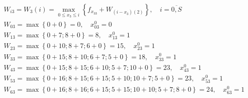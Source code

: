 \begin{align*}
     & W_{i3} = W_3(i) = \max\limits_{0 \leq x_3 \leq i} \left\{ f_{x_33} + W_{(i-x_3)(2)} \right\}, \quad i = \overline{0, S} \\
     & W_{03} = \max \left\{0 + 0\right\} = 0, \quad x_{03}^0 = 0                                                              \\
     & W_{13} = \max \left\{0 + 7; 8 + 0\right\} = 8, \quad x_{13}^0 = 1                                                       \\
     & W_{23} = \max \left\{0 + 10; 8 + 7; 6 + 0\right\} = 15, \quad x_{23}^0 = 1                                              \\
     & W_{33} = \max \left\{0 + 15; 8 + 10; 6 + 7; 5 + 0\right\} = 18, \quad x_{33}^0 = 1                                      \\
     & W_{43} = \max \left\{0 + 15; 8 + 15; 6 + 10; 5 + 7; 10 + 0\right\} = 23, \quad x_{43}^0 = 1                             \\
     & W_{53} = \max \left\{0 + 16; 8 + 15; 6 + 15; 5 + 10; 10 + 7; 5 + 0\right\} = 23, \quad x_{53}^0 = 1                     \\
     & W_{63} = \max \left\{0 + 16; 8 + 16; 6 + 15; 5 + 15; 10 + 10; 5 + 7; 8 + 0\right\} = 24, \quad x_{63}^0 = 1
\end{align*}

